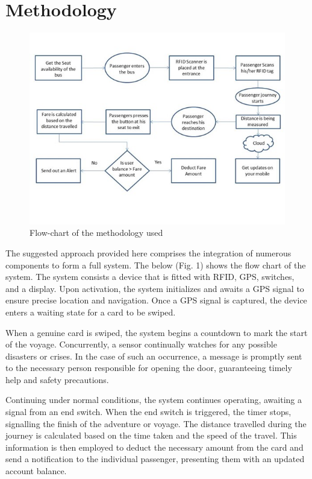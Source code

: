 \documentclass[conference]{IEEEtran}
\begin{document}
\section{Methodology}
\begin{figure}[htbp]
    \centering
    \includegraphics[width=0.8\linewidth]{Picture1.jpg}
    \caption{Flow-chart of the methodology used}
    \label{fig:label_name}
  \end{figure}
  The suggested approach provided here comprises the integration of numerous components to form a full system. The below (Fig. 1) shows the flow chart of the system. The system consists a device that is fitted with RFID, GPS, switches, and a display. Upon activation, the system initializes and awaits a GPS signal to ensure precise location and navigation. Once a GPS signal is captured, the device enters a waiting state for a card to be swiped.
   
  When a genuine card is swiped, the system begins a countdown to mark the start of the voyage. Concurrently, a sensor continually watches for any possible disasters or crises. In the case of such an occurrence, a message is promptly sent to the necessary person responsible for opening the door, guaranteeing timely help and safety precautions.

Continuing under normal conditions, the system continues operating, awaiting a signal from an end switch. When the end switch is triggered, the timer stops, signalling the finish of the adventure or voyage. The distance travelled during the journey is calculated based on the time taken and the speed of the travel. This information is then employed to deduct the necessary amount from the card and send a notification to the individual passenger, presenting them with an updated account balance.
\end{document}
